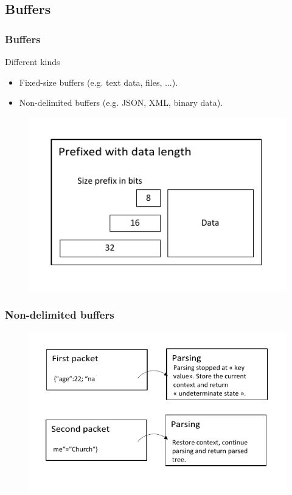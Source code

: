 \documentclass[xcolor=dvipsnames]{beamer}
\begin{document}
\subsection{Buffers}

\begin{frame}
\frametitle{Buffers}

\begin{block}{Different kinds}
\begin{itemize}
  \item Fixed-size buffers (e.g. text data, files, ...).
  \item Non-delimited buffers (e.g. JSON, XML, binary data).
\end{itemize}
\end{block}

\begin{figure}[p]
  \centering
  \includegraphics{images/fixed-buffer.pdf}
\end{figure}

\end{frame}

\begin{frame}
\frametitle{Non-delimited buffers}

\begin{figure}[p]
  \centering
  \includegraphics{images/parsing-buffer.pdf}
\end{figure}

\end{frame}
\end{document}
